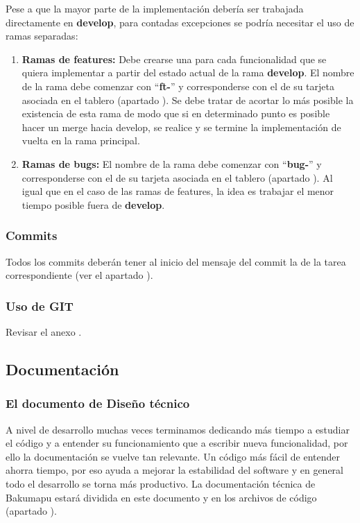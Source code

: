 Pese a que la mayor parte de la implementación debería ser trabajada directamente en \textbf{develop}, para contadas excepciones se podría necesitar el uso de ramas separadas:

\begin{enumerate}
	\renewcommand{\labelenumi}{\alph{enumi}.}
	\item \textbf{Ramas de features:} Debe crearse una para cada funcionalidad que se quiera implementar a partir del estado actual de la rama \textbf{develop}. El nombre de la rama debe comenzar con “\textbf{ft-}” y corresponderse con el de su tarjeta asociada en el tablero (apartado ). Se debe tratar de acortar lo más posible la existencia de esta rama de modo que si en determinado punto es posible hacer un merge hacia develop, se realice y se termine la implementación de vuelta en la rama principal.
	
	\item \textbf{Ramas de bugs:} El nombre de la rama debe comenzar con “\textbf{bug-}” y corresponderse con el de su tarjeta asociada en el tablero (apartado ). Al igual que en el caso de las ramas de features, la idea es trabajar el menor tiempo posible fuera de \textbf{develop}.
\end{enumerate}

\subsubsection{Commits}
Todos los commits deberán tener al inicio del mensaje del commit la  de la tarea correspondiente (ver el apartado ).

\subsubsection{Uso de GIT}
Revisar el anexo .


\subsection{Documentación}\label{flujo:documentacion}

\subsubsection{El documento de Diseño técnico}\label{flujo:documento-de-diseno}
A nivel de desarrollo muchas veces terminamos dedicando más tiempo a estudiar el código y a entender su funcionamiento que a escribir nueva funcionalidad, por ello la documentación se vuelve tan relevante. Un código más fácil de entender ahorra tiempo, por eso ayuda a mejorar la estabilidad del software y en general todo el desarrollo se torna más productivo. La documentación técnica de Bakumapu estará dividida en este documento y en los archivos de código (apartado ).

